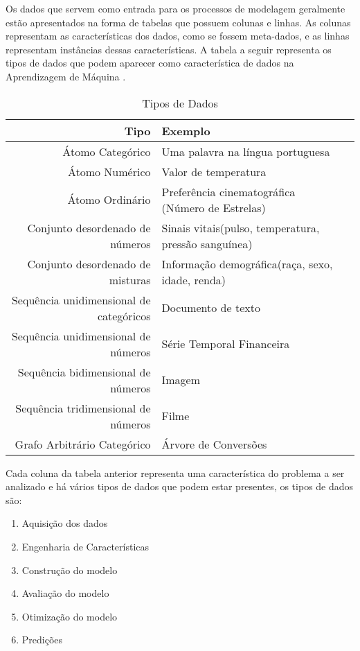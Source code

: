 Os dados que servem como entrada para os processos de modelagem geralmente estão apresentados na forma de tabelas que possuem colunas e linhas. As colunas representam as características dos dados, como se fossem meta-dados, e as linhas representam instâncias dessas características. A tabela a seguir representa os tipos de dados que podem aparecer como característica de dados na Aprendizagem de Máquina \cite{guy2010}.

\begin{table}[h]
\centering
\caption{Tipos de Dados}
\vspace{0.5cm}
\begin{tabular}{r|lr}

\hline 
Tipo & Exemplo  \\ %
\hline                               %
Átomo Categórico        & Uma palavra na língua portuguesa \\
\hline   
Átomo Numérico & Valor de temperatura \\
\hline 
Átomo Ordinário           & Preferência cinematográfica (Número de Estrelas) \\
\hline 
Conjunto desordenado de números       & Sinais vitais(pulso, temperatura, pressão sanguínea)\\
\hline 
Conjunto desordenado de misturas     & Informação demográfica(raça, sexo, idade, renda)\\
\hline 
Sequência unidimensional de categóricos       & Documento de texto\\
\hline 
Sequência unidimensional de números       & Série Temporal Financeira\\
\hline 
Sequência bidimensional de números      & Imagem\\
\hline 
Sequência tridimensional de números       & Filme\\
\hline 
Grafo Arbitrário Categórico       & Árvore de Conversões\\
 \hline 
\end{tabular}
\end{table}

Cada coluna da tabela anterior representa uma característica do problema a ser analizado e há vários tipos de dados que podem estar presentes, os tipos de dados são:

\begin{enumerate}
\item Aquisição dos dados
\item Engenharia de Características
\item Construção do modelo
\item Avaliação do modelo
\item Otimização do modelo
\item Predições
\end{enumerate}

